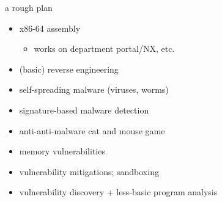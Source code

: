 \begin{frame}{a rough plan}
    \begin{itemize}
    \item x86-64 assembly
        \begin{itemize}
        \item works on department portal/NX, etc.
        \end{itemize}
    \item (basic) reverse engineering
    \item self-spreading malware (viruses, worms)
    \item signature-based malware detection
    \item anti-anti-malware cat and mouse game
    \item memory vulnerabilities 
    \item vulnerability mitigations; sandboxing
    \item vulnerability discovery + less-basic program analysis
    \end{itemize}
\end{frame}
